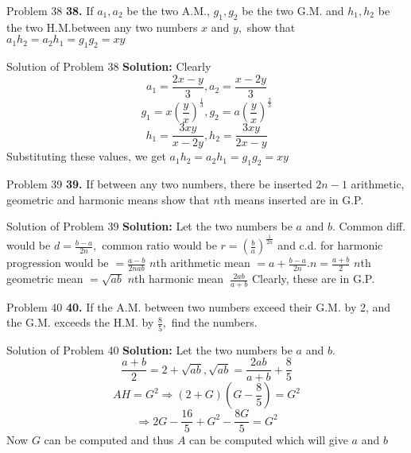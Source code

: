 \documentclass[aspectratio=1610,8pt]{beamer}
\begin{document}
\begin{frame}{Problem 38}
  \textbf{38.} If $a_1, a_2$ be the two A.M., $g_1, g_2$ be the two G.M. and
  $h_1, h_2$ be the two H.M.between any two numbers $x$ and $y,$ show that
  $a_1h_2 = a_2h_1 = g_1g_2 = xy$
\end{frame}
\begin{frame}{Solution of Problem 38}
  \textbf{Solution:} Clearly
  $$a_1 = \frac{2x - y}{3}, a_2 = \frac{x - 2y}{3}$$
  $$g_1 = x\left(\frac{y}{x}\right)^\frac{1}{3}, g_2 =
  a\left(\frac{y}{x}\right)^\frac{2}{3}$$
  $$h_1 = \frac{3xy}{x - 2y}, h_2 = \frac{3xy}{2x - y}$$
  Substituting these values, we get $a_1h_2 = a_2h_1 = g_1g_2 = xy$
\end{frame}
\begin{frame}{Problem 39}
  \textbf{39.} If between any two numbers, there be inserted $2n - 1$
  arithmetic, geometric and harmonic means show that $n$th means inserted are
  in G.P.
\end{frame}
\begin{frame}{Solution of Problem 39}
  \textbf{Solution:} Let the two numbers be $a$ and $b.$ Common diff. would be
  $d = \frac{b - a}{2n},$ common ratio would be $r =
  \left(\frac{b}{a}\right)^\frac{1}{2n}$ and c.d. for harmonic progression
  would be $= \frac{a - b}{2nab}$
  \linebreak
  \linebreak
  $n$th arithmetic mean $= a + \frac{b - a}{2n}.n = \frac{a + b}{2}$
  \linebreak
  \linebreak
  $n$th geometric mean $= \sqrt{ab}$
  \linebreak
  \linebreak
  $n$th harmonic mean $\ \frac{2ab}{a + b}$
  \linebreak
  \linebreak
  Clearly, these are in G.P.
\end{frame}
\begin{frame}{Problem 40}
  \textbf{40.} If the A.M. between two numbers exceed their G.M. by 2, and the
  G.M. exceeds the H.M. by $\frac{8}{5},$ find the numbers.
\end{frame}
\begin{frame}{Solution of Problem 40}
  \textbf{Solution:} Let the two numbers be $a$ and $b.$
  $$\frac{a + b}{2} = 2 + \sqrt{ab}, \sqrt{ab} = \frac{2ab}{a + b} +
  \frac{8}{5}$$
  $$AH = G^2\Rightarrow (2 + G)\left(G - \frac{8}{5}\right) =
  G^2$$
  $$\Rightarrow 2G - \frac{16}{5} + G^2 -\frac{8G}{5} = G^2$$
  Now $G$ can be computed and thus $A$ can be computed which will give $a$ and
  $b$
\end{frame}
\end{document}
